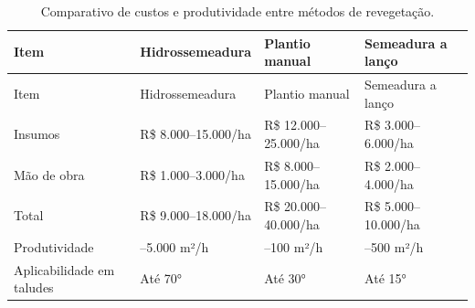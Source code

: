 \documentclass[
  portuguese,
  11pt,
  a4paper,
  open=any]{scrbook}
\begin{document}
\begin{longtable}[]{@{}
  >{\raggedright\arraybackslash}p{}
  >{\raggedright\arraybackslash}p{}
  >{\raggedright\arraybackslash}p{}
  >{\raggedright\arraybackslash}p{}@{}}
\caption{Comparativo de custos e produtividade entre métodos de
revegetação.}\label{tbl-custos-hidro}\tabularnewline
\toprule\noalign{}
\begin{minipage}[b]{\linewidth}\raggedright
Item
\end{minipage} & \begin{minipage}[b]{\linewidth}\raggedright
Hidrossemeadura
\end{minipage} & \begin{minipage}[b]{\linewidth}\raggedright
Plantio manual
\end{minipage} & \begin{minipage}[b]{\linewidth}\raggedright
Semeadura a lanço
\end{minipage} \\
\midrule\noalign{}
\endfirsthead
\toprule\noalign{}
\begin{minipage}[b]{\linewidth}\raggedright
Item
\end{minipage} & \begin{minipage}[b]{\linewidth}\raggedright
Hidrossemeadura
\end{minipage} & \begin{minipage}[b]{\linewidth}\raggedright
Plantio manual
\end{minipage} & \begin{minipage}[b]{\linewidth}\raggedright
Semeadura a lanço
\end{minipage} \\
\midrule\noalign{}
\endhead
\bottomrule\noalign{}
\endlastfoot
Insumos & R\$ 8.000--15.000/ha & R\$ 12.000--25.000/ha & R\$
3.000--6.000/ha \\
Mão de obra & R\$ 1.000--3.000/ha & R\$ 8.000--15.000/ha & R\$
2.000--4.000/ha \\
Total & R\$ 9.000--18.000/ha & R\$ 20.000--40.000/ha & R\$
5.000--10.000/ha \\
Produtividade & 3.000--5.000 m²/h & 50--100 m²/h & 200--500 m²/h \\
Aplicabilidade em taludes & Até 70° & Até 30° & Até 15° \\
\end{longtable}
\end{document}
